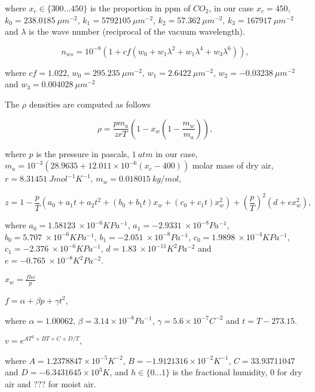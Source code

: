 where $x_c \in \lbrace 300 \ldots 450 \rbrace $ is the proportion in ppm of $CO_2$, in our case $x_c = 450$, $k_0 = 238.0185~\mu m^{-2}$, $k_1 = 5792105~\mu m^{-2}$, $k_2 = 57.362~\mu m^{-2}$, $k_3 = 167917~\mu m^{-2}$ and $\lambda$ is the wave number (reciprocal of the vacuum wavelength).

\begin{equation}
n_{ws} = 10^{-8} \left( 1 + cf(w_0 + w_1 \lambda^2 + w_1 \lambda^4 + w_3 \lambda^6) \right),
\end{equation}

where $cf = 1.022$, $w_0 = 295.235~\mu m^{-2}$, $w_1 = 2.6422~\mu m^{-2}$, $w_2 = -0.03238~\mu m^{-2}$ and $w_3 = 0.004028~\mu m^{-2}$

The $\rho$ densities are computed as follows

\begin{equation}
\rho =  \frac{p m_a}{zrT} \left( 1 - x_w \left(1 - \frac{m_w}{m_a} \right) \right), 
\end{equation}

where $p$ is the pressure in pascals, $1~atm$ in our case, $m_a = 10^{-3}(28.9635 + 12.011 \times 10^{-6}(x_c - 400))$ molar mass of dry air, $r = 8.31451~J mol^{-1} K^{-1}$, $m_w = 0.018015~kg/mol$, 

\begin{equation}
z = 1 - \frac{p}{T} \left(a_0 + a_1 t + a_2 t^2 + \left(b_0 + b_1 t \right) x_w + \left(c_0 + c_1 t \right) x_w^2 \right) + \left( \frac{p}{T} \right)^2 \left( d + ex_w^2 \right),
\end{equation}

where $a_0 = 1.58123~\times 10 ^{-6} K Pa^{-1}$,  $a_1 =-2.9331 ~\times 10 ^{-8} Pa^{-1}$,  $b_0 = 5.707~\times 10 ^{-6} K Pa^{-1}$,  $b_1 = -2.051~\times 10 ^{-8} Pa^{-1}$,  $c_0 = 1.9898~\times 10 ^{-4} K Pa^{-1}$,  $c_1 = -2.376~\times 10 ^{-6} K Pa^{-1}$,  $d = 1.83~\times 10 ^{-11} K^2 Pa^{-2}$ and  $e = -0.765~\times 10 ^{-8} K^2 Pa^{-2}$.

$x_w = \frac{f h v}{ p}$

$f = \alpha + \beta p + \gamma t^2$,

where $\alpha = 1.00062$, $\beta = 3.14 \times 10^{-8} Pa^{-1}$, $\gamma = 5.6 \times 10^{-7} C^{-2}$ and $t = T - 273.15$.

$v = e^{AT^2 + BT + C + D/T}$,

where $A = 1.2378847 \times 10^{-5} K^{-2}$, $B = -1.9121316 \times 10^{-2} K^{-1}$, $C = 33.93711047$ and $D = -6.3431645 \times 10^3 K$, and $h \in \lbrace 0 \ldots 1 \rbrace$ is the fractional humidity, $0$ for dry air and ??? for moist air.

